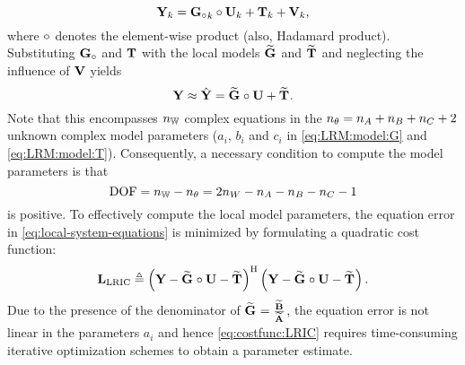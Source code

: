 \begin{equation}
  \mathbf{Y}_k  = {{\mathbf{G}}_{\circ}}_k \circ \mathbf{U}_k + \mathbf{T}_k + \mathbf{V}_k
\text{,}
\end{equation} 
where $\circ$ denotes the element-wise product (also, Hadamard product).
Substituting ${\mathbf{G}}_{\circ}$ and $\mathbf{T}$ with the local models $\mathbf{\widetilde{G}}_{} $ and $\mathbf{\widetilde{T}}_{} $ and neglecting the influence of $\mathbf{V}$ yields
\begin{equation}
  \mathbf{Y} 
  \approx 
  \hat{\mathbf{Y}} 
    =
      \mathbf{\widetilde{G}}_{}  \circ \mathbf{U} + \mathbf{\widetilde{T}}_{} 
      \text{.}
      \label{eq:local-system-equations}
\end{equation}
Note that this encompasses $n_{\mathbb{W}}$ complex equations in the $n_{\theta} = n_{A} + n_{B} + n_{C} + 2$  unknown complex model parameters ($a_i$, $b_i$ and $c_i$ in \eqref{eq:LRM:model:G} and \eqref{eq:LRM:model:T}).
Consequently, a necessary condition to compute the model parameters is that
\begin{equation}
  \mathrm{DOF} = n_{\mathbb{W}} - n_{\theta}
       = 2 n_{W} - n_{A} - n_{B} - n_{C} - 1
\end{equation}
is positive.
To effectively compute the local model parameters, the equation error in \eqref{eq:local-system-equations} is minimized by formulating a quadratic cost function:
\begin{equation}
  \mathbf{L_{\mathrm{LRIC}}} 
    \triangleq 
      \left( \mathbf{Y}  -  \mathbf{\widetilde{G}}_{}  \circ \mathbf{U} - \mathbf{\widetilde{T}}_{}  \right)^{\mathrm{H}} 
      \left( \mathbf{Y}  -  \mathbf{\widetilde{G}}_{}  \circ \mathbf{U} - \mathbf{\widetilde{T}}_{}  \right)
   \label{eq:costfunc:LRIC}
   \text{.}
\end{equation}
Due to the presence of the denominator of $\mathbf{\widetilde{G}}_{}  = \frac{\mathbf{\widetilde{B}}_{} }{\mathbf{\widetilde{A}}_{} }$, the equation error is not linear in the parameters $a_i$ and hence \eqref{eq:costfunc:LRIC} requires time-consuming iterative optimization schemes to obtain a parameter estimate.


